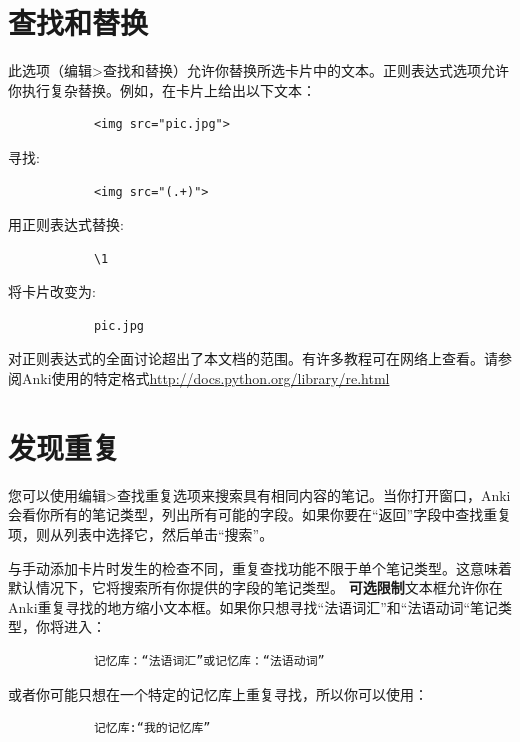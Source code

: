 \documentclass[a4paper]{book}
\newcounter{img}[chapter]
\begin{document}
		\section{查找和替换}\label{findreplace}
		此选项（编辑>查找和替换）允许你替换所选卡片中的文本。正则表达式选项允许你执行复杂替换。例如，在卡片上给出以下文本：
		\begin{shaded}\begin{verbatim}
			<img src="pic.jpg">
			\end{verbatim}\end{shaded}
		寻找:
		\begin{shaded}\begin{verbatim}
			<img src="(.+)">
			\end{verbatim}\end{shaded}
		用正则表达式替换:
		\begin{shaded}\begin{verbatim}
			\1
			\end{verbatim}\end{shaded}
		将卡片改变为:
		\begin{shaded}\begin{verbatim}
			pic.jpg
			\end{verbatim}\end{shaded}
		对正则表达式的全面讨论超出了本文档的范围。有许多教程可在网络上查看。请参阅Anki使用的特定格式\url{http://docs.python.org/library/re.html}
		\section{发现重复}
		您可以使用编辑>查找重复选项来搜索具有相同内容的笔记。当你打开窗口，Anki会看你所有的笔记类型，列出所有可能的字段。如果你要在“返回”字段中查找重复项，则从列表中选择它，然后单击“搜索”。
		
		与手动添加卡片时发生的检查不同，重复查找功能不限于单个笔记类型。这意味着默认情况下，它将搜索所有你提供的字段的笔记类型。
		\textbf{可选限制}文本框允许你在Anki重复寻找的地方缩小文本框。如果你只想寻找“法语词汇”和“法语动词“笔记类型，你将进入：
		
		\begin{shaded}\begin{verbatim}
			记忆库：“法语词汇”或记忆库：“法语动词”
			\end{verbatim}\end{shaded}
		
		或者你可能只想在一个特定的记忆库上重复寻找，所以你可以使用：
		
		\begin{shaded}\begin{verbatim}
			记忆库:“我的记忆库”
			\end{verbatim}\end{shaded}
		
\end{document}
